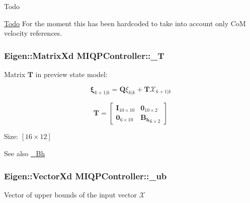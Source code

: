 \begin{DoxyRefDesc}{\-Todo}
\item[\hyperlink{todo__todo000008}{\-Todo}]\-For the moment this has been hardcoded to take into account only \-Co\-M velocity references. \end{DoxyRefDesc}
\hypertarget{classMIQPController_a1143455ae85d0e221578dbe5d659af1d}{
\subsubsection[{\-\_\-\-T}]{\setlength{\rightskip}{0pt plus 5cm}\-Eigen\-::\-Matrix\-Xd {\bf \-M\-I\-Q\-P\-Controller\-::\-\_\-\-T}}}\label{classMIQPController_a1143455ae85d0e221578dbe5d659af1d}
\-Matrix $\mathbf{T}$ in preview state model\-:

\[ \mathbf{\xi}_{k+1|k} = \mathbf{Q} \xi_{k|k} + \mathbf{T}\mathcal{X}_{k+1|k} \]

\[ \mathbf{T} = \left[\begin{array}{cc} \mathbf{I}_{10\times10} & \mathbf{0}_{10\times2}\\ \mathbf{0}_{6\times10} & \mathbf{B_h}_{6\times2} \end{array}\right] \]

\-Size\-: $[16\times12]$ \begin{DoxySeeAlso}{\-See also}
\hyperlink{classMIQPController_a9a989875871a898f0ad19b441a2c67ba}{\-\_\-\-Bh} 
\end{DoxySeeAlso}
\hypertarget{classMIQPController_aa8407451ad8b20c814b12fef631f43f6}{
\subsubsection[{\-\_\-ub}]{\setlength{\rightskip}{0pt plus 5cm}\-Eigen\-::\-Vector\-Xd {\bf \-M\-I\-Q\-P\-Controller\-::\-\_\-ub}}}\label{classMIQPController_aa8407451ad8b20c814b12fef631f43f6}
\-Vector of upper bounds of the input vector $\mathcal{X}$

